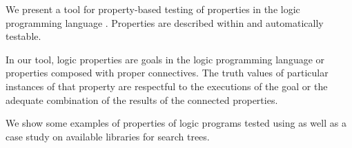 We present a tool for property-based testing of properties in the logic
programming language \Prolog{}.
%
Properties are described within \Prolog{} and automatically testable.

In our tool, logic properties are goals in the logic programming
language or properties composed with proper connectives.
%
The truth values of particular instances of that property are respectful
to the executions of the goal or the adequate combination of the results
of the connected properties.


We show some examples of properties of logic programs tested
using \plqc{} as well as a case study on available libraries for search
trees.

